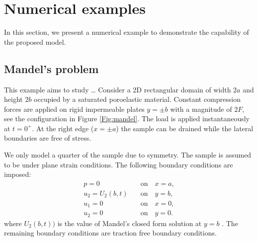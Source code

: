 \section{Numerical examples}
\label{sec:num-examples}
In this section, we present a numerical example to demonstrate the capability of the proposed model. 
\subsection{Mandel's problem}
This example aims to study \dots
Consider a 2D rectangular domain of width $2a$ and height $2b$ occupied by a saturated poroelastic material. Constant compression forces are applied on rigid impermeable plates $y=\pm b$ with a magnitude of $2F$, see the configuration in Figure \ref{Fig:mandel}. The load is applied instantaneously at $t=0^+$. At the right edge ($x = \pm a$) the sample can be drained while the lateral boundaries are free of stress.

We only model a quarter of the sample due to symmetry. The sample is assumed to be under plane strain conditions. The following boundary conditions are imposed:
\begin{eqnarray*}
	p=0 \quad &\text{on}  \quad x=a, \\
	u_2=U_2(b,t) \quad &\text{on}\quad y=b,\\
	u_1=0 \quad &\text{on} \quad x=0,\\
	u_2=0 \quad &\text{on} \quad y=0.
\end{eqnarray*}
where $U_2(b,t))$ is the value of Mandel's closed form solution at $y =  b$ \cite{abousleiman1996mandel}.
The remaining boundary conditions are traction free boundary conditions.


